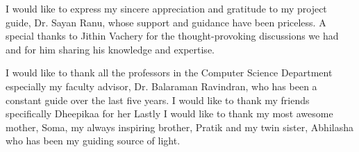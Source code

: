 
I would like to express my sincere appreciation and gratitude to my project guide, Dr. Sayan Ranu, whose support and guidance have been priceless. A special thanks to Jithin Vachery for the thought-provoking discussions we had and for him sharing his knowledge and expertise.

I would like to thank all the professors in the Computer Science Department especially my faculty advisor, Dr. Balaraman Ravindran, who has been a constant guide over the last five years. I would like to thank my friends specifically Dheepikaa for her 
Lastly I would like to thank my most awesome mother, Soma, my always inspiring brother, Pratik and my twin sister, Abhilasha who has been my guiding source of light.
      